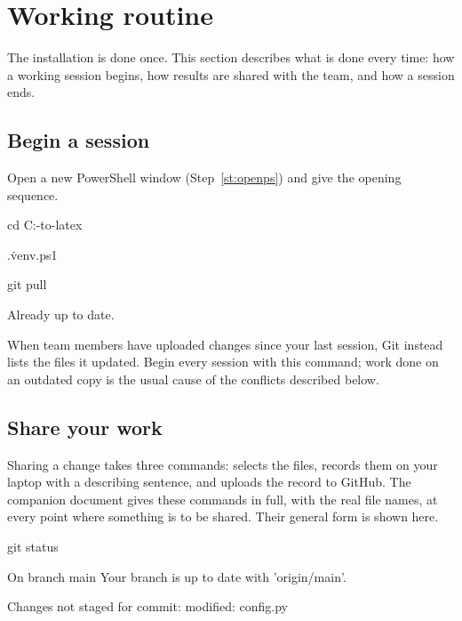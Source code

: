 \section{Working routine}
\label{sec:routine}

The installation is done once. This section describes what is done every time: how a working
session begins, how results are shared with the team, and how a session ends.

\subsection{Begin a session}

Open a new PowerShell window (Step~\ref{st:openps}) and give the opening sequence.
\begin{ps}
cd C:\camera-to-latex
\end{ps}
\begin{ps}
.\.venv\Scripts\Activate.ps1
\end{ps}
\venvprompt

\label{st:pull}
\begin{ps}
git pull
\end{ps}
\begin{out}
Already up to date.
\end{out}
When team members have uploaded changes since your last session, Git instead lists the files it
updated. Begin every session with this command; work done on an outdated copy is the usual
cause of the conflicts described below.

\subsection{Share your work}

Sharing a change takes three commands:  selects the files,  records
them on your laptop with a describing sentence, and  uploads the record to GitHub.
The companion document gives these commands in full, with the real file names, at every point
where something is to be shared. Their general form is shown here.

\begin{ps}
git status
\end{ps}
\begin{out}
On branch main
Your branch is up to date with 'origin/main'.

Changes not staged for commit:
        modified:   config.py
\end{out}

